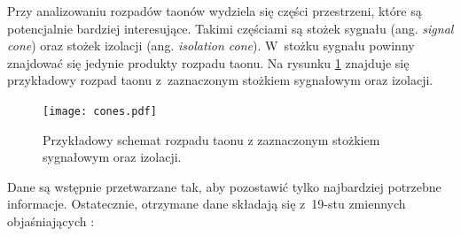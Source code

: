 \documentclass{pracalicmgr}
\begin{document}
	Przy analizowaniu rozpadów taonów wydziela się części przestrzeni, które są potencjalnie bardziej interesujące. Takimi częściami są stożek sygnału (ang. \textit{signal cone}) oraz stożek izolacji (ang. \textit{isolation cone}). W~stożku sygnału powinny znajdować się jedynie produkty rozpadu taonu. Na rysunku \ref{fig:cones} znajduje się przykładowy rozpad taonu z~zaznaczonym stożkiem sygnałowym oraz izolacji.

	\begin{figure}[H]
	\centering
	\texttt{[image: cones.pdf]}
	\caption{Przykładowy schemat rozpadu taonu z zaznaczonym stożkiem sygnałowym oraz izolacji.}
	\label{fig:cones}
	\end{figure}

\newpage    
Dane są wstępnie przetwarzane tak, aby pozostawić tylko najbardziej potrzebne informacje. Ostatecznie, otrzymane dane składają się z~19-stu zmiennych objaśniających \cite{cms2016reconstruction}:
\end{document}
